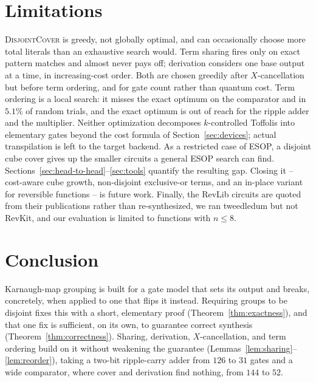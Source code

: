\documentclass[conference]{IEEEtran}
\newcommand{\Algo}[1]{\textup{\textsc{#1}}}
\theoremstyle{plain}
\begin{document}
\section{Limitations}
\label{sec:limitations}

\Algo{DisjointCover} is greedy, not globally optimal, and can occasionally
choose more total literals than an exhaustive search would. Term sharing
fires only on exact pattern matches and almost never pays off; derivation
considers one base output at a time, in increasing-cost order. Both are
chosen greedily after $X$-cancellation but before term ordering, and for
gate count rather than quantum cost. Term ordering is a local search: it
misses the exact optimum on the comparator and in $5.1\%$ of random
trials, and the exact optimum is out of reach for the ripple adder and
the multiplier.
Neither optimization decomposes
$k$-controlled Toffolis into elementary gates beyond the cost formula of
Section~\ref{sec:devices}; actual transpilation is left to the target
backend. As a restricted case of ESOP, a disjoint cube cover gives up
the smaller circuits a general ESOP search can find.
Sections~\ref{sec:head-to-head}--\ref{sec:tools} quantify the resulting
gap. Closing it
-- cost-aware cube growth, non-disjoint exclusive-or terms, and an
in-place variant for reversible functions -- is future work. Finally, the
RevLib circuits are quoted from their publications rather than
re-synthesized, we ran tweedledum but not RevKit, and our evaluation is
limited to functions with $n\le 8$.

\section{Conclusion}

Karnaugh-map grouping is built for a gate model that sets its output and
breaks, concretely, when applied to one that flips it instead. Requiring
groups to be disjoint fixes this with a short, elementary proof
(Theorem~\ref{thm:exactness}), and that one fix is sufficient, on its own,
to guarantee correct synthesis (Theorem~\ref{thm:correctness}). Sharing,
derivation, $X$-cancellation, and term ordering build on it without
weakening the guarantee (Lemmas~\ref{lem:sharing}--\ref{lem:reorder}),
taking a two-bit ripple-carry adder from $126$ to $31$ gates and a wide
comparator, where cover and derivation find nothing, from $144$ to $52$.
\end{document}
